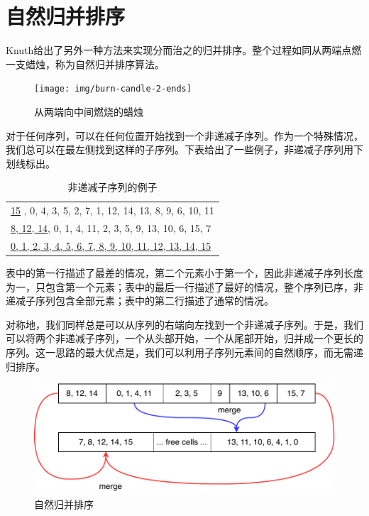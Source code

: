 \documentclass[b5paper]{ctexart}
\begin{document}
\section{自然归并排序}

Knuth给出了另外一种方法来实现分而治之的归并排序。整个过程如同从两端点燃一支蜡烛\cite{TAOCP}，称为自然归并排序算法。

\begin{figure}[htbp]
 \centering
 \texttt{[image: img/burn-candle-2-ends]}
 \caption{从两端向中间燃烧的蜡烛}
 \label{fig:burn-candle}
\end{figure}

对于任何序列，可以在任何位置开始找到一个非递减子序列。作为一个特殊情况，我们总可以在最左侧找到这样的子序列。下表给出了一些例子，非递减子序列用下划线标出。

\begin{table}[htbp]
\centering
\begin{tabular}{ | l |}
\hline
\underline{15} , 0, 4, 3, 5, 2, 7, 1, 12, 14, 13, 8, 9, 6, 10, 11 \\
\underline{8, 12, 14}, 0, 1, 4, 11, 2, 3, 5, 9, 13, 10, 6, 15, 7 \\
\underline{0, 1, 2, 3, 4, 5, 6, 7, 8, 9, 10, 11, 12, 13, 14, 15} \\
\hline
\end{tabular}
\caption{非递减子序列的例子} %
\end{table}

表中的第一行描述了最差的情况，第二个元素小于第一个，因此非递减子序列长度为一，只包含第一个元素；表中的最后一行描述了最好的情况，整个序列已序，非递减子序列包含全部元素；表中的第二行描述了通常的情况。

对称地，我们同样总是可以从序列的右端向左找到一个非递减子序列。于是，我们可以将两个非递减子序列，一个从头部开始，一个从尾部开始，归并成一个更长的序列。这一思路的最大优点是，我们可以利用子序列元素间的自然顺序，而无需递归排序。

\begin{figure}[htbp]
 \centering
 \includegraphics[scale=0.8]{img/nature-merge-sort}
 \caption{自然归并排序}
 \label{fig:nature-merge-sort}
\end{figure}
\end{document}
